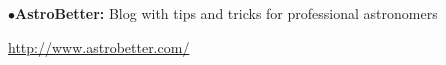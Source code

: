 \medskip

\item{$\bullet$}{\bf AstroBetter:} 
Blog with tips and tricks for professional astronomers
	\item{}\qquad\url{http://www.astrobetter.com/}


\medskip


\endRPPonly



